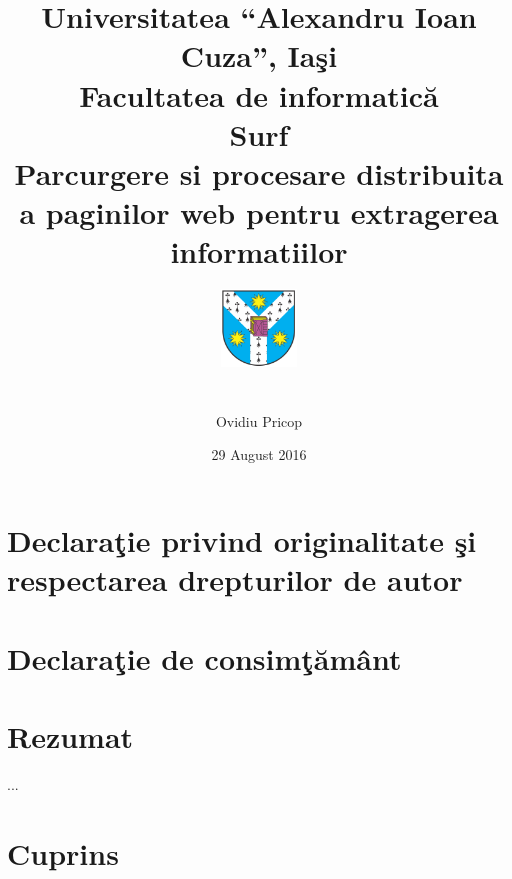 \documentclass[12pt,twoside]{report}
\newcommand{\GLOBALDATE}{29 August 2016}
\begin{document}
\title{
	\large{Universitatea \enquote{Alexandru Ioan Cuza}, Ia\c{s}i} \\
	\vspace{0.5cm}
	\large{\textbf{Facultatea de informatic\u{a}}} \\
      \vspace{2cm}
	\LARGE{Surf} \\
	\vspace{1cm}
	\large{Parcurgere si procesare distribuita a paginilor web pentru extragerea informatiilor} \\
	\vspace{1cm}
	\vspace{1cm}
	\includegraphics[width=2cm,height=3cm,keepaspectratio]{uaic_sigla.png}
}

\author{Ovidiu Pricop}
\date{\GLOBALDATE}

\maketitle


\chapter*{
	\large{
		Declara\c{t}ie privind originalitate \c{s}i respectarea drepturilor de
		autor
	}
}



\chapter*{
	\large{
		Declara\c{t}ie de consim\c{t}\u{a}m\^{a}nt
	}
}



\chapter*{\LARGE{Rezumat}}
...

\chapter{Cuprins}
\end{document}
